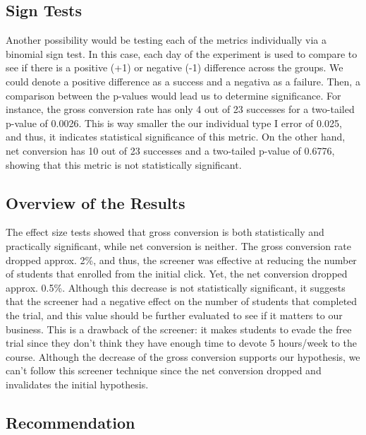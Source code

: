 \documentclass[11pt]{article}
\begin{document}
	\subsection{Sign Tests}

		Another possibility would be testing each of the metrics individually via a binomial sign test.
		In this case, each day of the experiment is used to compare to see if there is a positive (+1) or negative (-1) difference across the groups.
		We could denote a positive difference as a success and a negativa as a failure.
		Then, a comparison between the p-values would lead us to determine significance.
		For instance, the gross conversion rate has only 4 out of 23 successes for a two-tailed p-value of 0.0026.
		This is way smaller the our individual type I error of 0.025, and thus, it indicates statistical significance of this metric.
		On the other hand, net conversion has 10 out of 23 successes and a two-tailed p-value of 0.6776, showing that this metric is not statistically significant.
	

	\subsection{Overview of the Results}
		The effect size tests showed that gross conversion is both statistically and practically significant, while net conversion is neither.
		The gross conversion rate dropped approx. 2\%, and thus, the screener was effective at reducing the number of students that enrolled from the initial click.
		Yet, the net conversion dropped approx. 0.5\%. 
		Although this decrease is not statistically significant, it suggests that the screener had a negative effect on the number of students that completed the trial, and this value should be further evaluated to see if it matters to our business.
		This is a drawback of the screener: it makes students to evade the free trial since they don't think they have enough time to devote 5 hours/week to the course.
		Although the decrease of the gross conversion supports our hypothesis, we can't follow this screener technique since the net conversion dropped and invalidates the initial hypothesis.
	
	\subsection{Recommendation}
	
\end{document}

